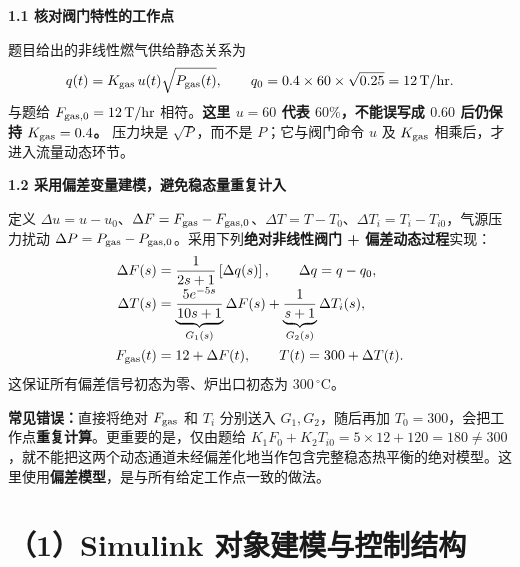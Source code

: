 \documentclass[UTF8,a4paper,11pt]{ctexart}
\newcommand{\task}[1]{\par\noindent\textcolor{accent}{\textbf{#1}}\par}
\newcommand{\dev}{\Delta}
\newcommand{\unit}[1]{\,\mathrm{#1}}
\begin{document}
\task{1.1 核对阀门特性的工作点}
题目给出的非线性燃气供给静态关系为
\begin{equation}\label{eq:valve}
q(t)=K_{\rm gas}\,u(t)\sqrt{P_{\rm gas}(t)},\qquad
q_0=0.4\times60\times\sqrt{0.25}=12\unit{T/hr}.
\end{equation}
与题给 $F_{\rm gas,0}=12\unit{T/hr}$ 相符。\textbf{这里 $u=60$ 代表 $60\%$，不能误写成 $0.60$ 后仍保持 $K_{\rm gas}=0.4$。} 压力块是 $\sqrt{P}$，而不是 $P$；它与阀门命令 $u$ 及 $K_{\rm gas}$ 相乘后，才进入流量动态环节。

\task{1.2 采用偏差变量建模，避免稳态量重复计入}
定义 $\dev u=u-u_0$、$\dev F=F_{\rm gas}-F_{\rm gas,0}$、$\dev T=T-T_0$、$\dev T_i=T_i-T_{i0}$，气源压力扰动 $\dev P=P_{\rm gas}-P_{\rm gas,0}$。采用下列\textbf{绝对非线性阀门 + 偏差动态过程}实现：
\begin{align}
\dev F(s)&=\frac{1}{2s+1}\left[\dev q(s)\right],\qquad \dev q=q-q_0,\\[-1mm]
\dev T(s)&=\underbrace{\frac{5e^{-5s}}{10s+1}}_{G_1(s)}\dev F(s)
+\underbrace{\frac{1}{s+1}}_{G_2(s)}\dev T_i(s),\label{eq:plant}\\
F_{\rm gas}(t)&=12+\dev F(t),\qquad T(t)=300+\dev T(t).
\end{align}
这保证所有偏差信号初态为零、炉出口初态为 $300\unit{^\circ C}$。
\begin{warnbox}
\textbf{常见错误：}直接将绝对 $F_{\rm gas}$ 和 $T_i$ 分别送入 $G_1,G_2$，随后再加 $T_0=300$，会把工作点\textbf{重复计算}。更重要的是，仅由题给 $K_1F_0+K_2T_{i0}=5\times12+120=180\neq300$，就不能把这两个动态通道未经偏差化地当作包含完整稳态热平衡的绝对模型。这里使用\textbf{偏差模型}，是与所有给定工作点一致的做法。
\end{warnbox}

\section{（1）Simulink 对象建模与控制结构}
\end{document}
